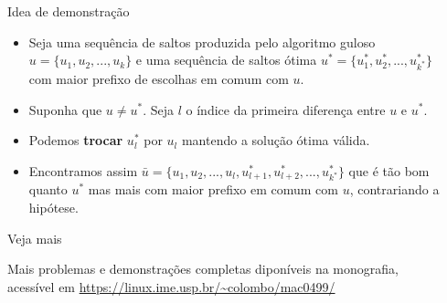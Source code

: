 \documentclass[final,hyperref={pdfpagelabels=false}]{beamer}
\begin{document}
\begin{frame}[t]
\begin{columns}[t]
\begin{column}{.465\textwidth}

\begin{block}{Idea de demonstração}

\begin{itemize}
    \item Seja uma sequência de saltos produzida pelo algoritmo guloso $u = \{u_1, u_2, ..., u_k\}$ e uma sequência de saltos ótima $u^* = \{u^*_1, u^*_2, ..., u^*_{k^*}\}$ com maior prefixo de escolhas em comum com $u$. 
    \item Suponha que $u \neq u^*$. Seja $l$ o índice da primeira diferença entre $u$ e $u^*$.
    \item Podemos \textbf{trocar} $u^*_l$ por $u_l$ mantendo a solução ótima válida.
    \item Encontramos assim $\bar{u} = \{u_1, u_2, ..., u_l, u^*_{l + 1}, u^*_{l + 2}, ..., u^*_{k^*}\}$ que é tão bom quanto $u^*$ mas mais com maior prefixo em comum com $u$, contrariando a hipótese.
\end{itemize}

\end{block}


\begin{block}{Veja mais}

Mais problemas e demonstrações completas diponíveis na monografia, acessível em \url{https://linux.ime.usp.br/~colombo/mac0499/}

\end{block}


\end{column} %

\begin{column}{.015\textwidth}\end{column} %

\end{columns} %

\end{frame} %
\end{document}
